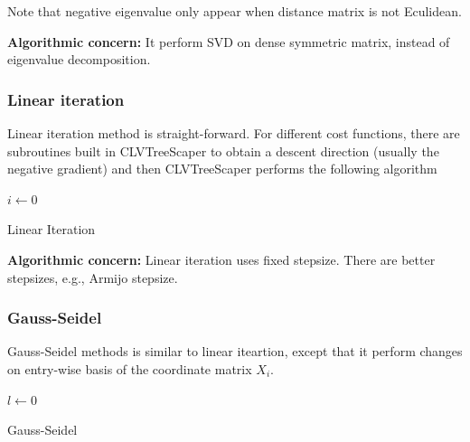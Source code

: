 \documentclass[11pt]{article}
\begin{document}
Note that negative eigenvalue only appear when distance matrix is not Eculidean.



{\bf Algorithmic concern:} It perform SVD on dense symmetric matrix, instead of eigenvalue decomposition.

\subsubsection{Linear iteration} 

Linear iteration method is straight-forward. For different cost functions, there are subroutines built in CLVTreeScaper to obtain a descent direction (usually the negative gradient) and then CLVTreeScaper performs the following algorithm

\begin{algorithm}[H]
    \DontPrintSemicolon
	$i\gets 0$\;
    \caption{Linear Iteration}
    \label{alg:LinearIteration}
\end{algorithm}

{\bf Algorithmic concern:} Linear iteration uses fixed stepsize. There are better stepsizes, e.g., Armijo stepsize.


\subsubsection{Gauss-Seidel} 

Gauss-Seidel methods is similar to linear iteartion, except that it perform changes on entry-wise basis of the coordinate matrix $X_i$.

\begin{algorithm}[H]
    \DontPrintSemicolon
	$l\gets 0$\;
    \caption{Gauss-Seidel}
    \label{alg:GaussSeidel}
\end{algorithm}
\end{document}
